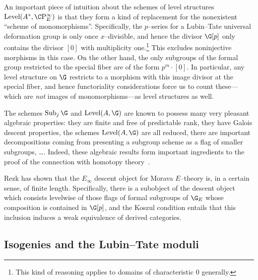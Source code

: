\begin{remark}
An important piece of intuition about the schemes of level structures $\Level(A^*, \CP^\infty_E)$ is that they form a kind of replacement for the nonexistent ``scheme of monomorphisms''.  Specifically, the $p$--series for a Lubin--Tate universal deformation group is only once $x$--divisible, and hence the divisor $\G[p]$ only contains the divisor $[0]$ with multiplicity one.\footnote{This kind of reasoning applies to domains of characteristic $0$ generally.}  This excludes noninjective morphisms in this case.  On the other hand, the only subgroups of the formal group restricted to the special fiber are of the form $p^m \cdot [0]$.  In particular, any level structure on $\G$ restricts to a morphism with this image divisor at the special fiber, and hence functoriality considerations force us to count these---which are \emph{not} images of monomorphisms---as level structures as well.
\end{remark}

\begin{remark}
The schemes $\Sub_j \G$ and $\Level(A, \G)$ are known to possess many very pleasant algebraic properties: they are finite and free of predictable rank, they have Galois descent properties, the schemes $\Level(A, \G)$ are all reduced, there are important decompositions coming from presenting a subgroup scheme as a flag of smaller subgroups, \ldots.  Indeed, these algebraic results form important ingredients to the proof of the connection with homotopy theory~\cite[Section 9]{StricklandEthyOfBSigma}.
\end{remark}

\begin{remark}
Rezk has shown that the $E_\infty$ descent object for Morava $E$--theory is, in a certain sense, of finite length.  Specifically, there is a subobject of the descent object which consists levelwise of those flags of formal subgroups of $\G_E$ whose composition is contained in $\G[p]$, and the Koszul condition entails that this inclusion induces a weak equivalence of derived categories.
\end{remark}










\subsection*{Isogenies and the Lubin--Tate moduli}\label{IsogeniesSection}

